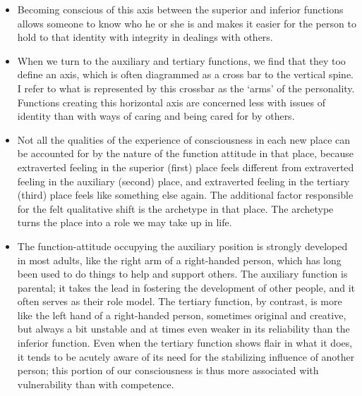 \begin{itemize}

\item Becoming conscious of this axis between the superior and inferior
functions allows someone to know who he or she is and makes it easier for the
person to hold to that identity with integrity in dealings with others.

\item When we turn to the auxiliary and tertiary functions, we find that they
too define an axis, which is often diagrammed as a cross bar to the vertical
spine. I refer to what is represented by this crossbar as the ‘arms’ of the
personality. Functions creating this horizontal axis are concerned less with
issues of identity than with ways of caring and being cared for by others.

\item Not all the qualities of the experience of consciousness in each new
place can be accounted for by the nature of the function attitude in that
place, because extraverted feeling in the superior (first) place feels
different from extraverted feeling in the auxiliary (second) place, and
extraverted feeling in the tertiary (third) place feels like something else
again. The additional factor responsible for the felt qualitative shift is the
archetype in that place. The archetype turns the place into a role we may take
up in life.

\item The function-attitude occupying the auxiliary position is strongly
developed in most adults, like the right arm of a right-handed person, which
has long been used to do things to help and support others. The auxiliary
function is parental; it takes the lead in fostering the development of other
people, and it often serves as their role model. The tertiary function, by
contrast, is more like the left hand of a right-handed person, sometimes
original and creative, but always a bit unstable and at times even weaker in
its reliability than the inferior function. Even when the tertiary function
shows flair in what it does, it tends to be acutely aware of its need for the
stabilizing influence of another person; this portion of our consciousness is
thus more associated with vulnerability than with competence.


\end{itemize}
